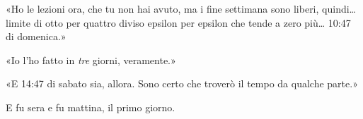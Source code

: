 «Ho le lezioni ora, che tu non hai avuto, ma i fine settimana sono liberi, quindi… limite di otto per quattro diviso epsilon per epsilon che tende a zero più… 10:47 di domenica.»

«Io l’ho fatto in \textit{tre} giorni, veramente.»

«E 14:47 di sabato sia, allora. Sono certo che troverò il tempo da qualche parte.»

E fu sera e fu mattina, il primo giorno.



